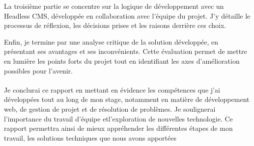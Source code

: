 La troisième partie se concentre sur la logique de développement avec un Headless CMS, développée en collaboration avec l'équipe du projet. J'y détaille le processus de réflexion, les décisions prises et les raisons derrière ces choix.


Enfin, je termine par une analyse critique de la solution développée, en présentant ses avantages et ses inconvénients. Cette évaluation permet de mettre en lumière les points forts du projet tout en identifiant les axes d'amélioration possibles pour l'avenir.
\\ \\
Je conclurai ce rapport en mettant en évidence les compétences que j'ai développées tout au long de mon stage, notamment en matière de développement web, de gestion de projet et de résolution de problèmes. Je soulignerai l'importance du travail d'équipe etl'exploration de nouvelles technologie. Ce rapport permettra ainsi de mieux appréhender les différentes étapes de mon travail, les solutions techniques que nous avons apportées
